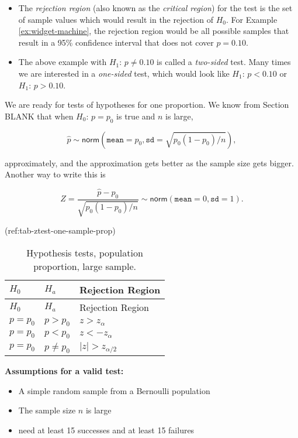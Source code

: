 \documentclass[]{book}
\providecommand{\tightlist}{%
  \setlength{\itemsep}{0pt}\setlength{\parskip}{0pt}}
\numberwithin{equation}{chapter}
\numberwithin{figure}{chapter}
\theoremstyle{plain}
\theoremstyle{definition}
\theoremstyle{remark}
\theoremstyle{definition}
\theoremstyle{definition}
\theoremstyle{remark}
\begin{document}
\begin{itemize}
\tightlist
\item
  The \emph{rejection region} (also known as the \emph{critical region})
  for the test is the set of sample values which would result in the
  rejection of \(H_{0}\). For Example \ref{ex:widget-machine}, the
  rejection region would be all possible samples that result in a 95\%
  confidence interval that does not cover \(p = 0.10\).
\item
  The above example with \(H_{1}:\,p \neq 0.10\) is called a
  \emph{two-sided} test. Many times we are interested in a
  \emph{one-sided} test, which would look like \(H_{1}:\,p < 0.10\) or
  \(H_{1}:\,p >  0.10\).
\end{itemize}

We are ready for tests of hypotheses for one proportion. We know from
Section BLANK that when \(H_{0}:\,p = p_{0}\) is true and \(n\) is
large,

\begin{equation}
\hat{p} \sim \mathsf{norm}(\mathtt{mean} = p_{0}, \mathtt{sd} = \sqrt{p_{0}(1 - p_{0})/n}),
\end{equation}

approximately, and the approximation gets better as the sample size gets
bigger. Another way to write this is

\begin{equation}
Z = \frac{\hat{p} - p_{0}}{\sqrt{p_{0}(1 - p_{0})/n}}  \sim \mathsf{norm}(\mathtt{mean} = 0, \mathtt{sd} = 1).
\end{equation}

(ref:tab-ztest-one-sample-prop)

\begin{longtable}[]{@{}lll@{}}
\caption{Hypothesis tests, population proportion, large
sample.}\tabularnewline
\toprule
\(H_{0}\) & \(H_{a}\) & Rejection Region\tabularnewline
\midrule
\endfirsthead
\toprule
\(H_{0}\) & \(H_{a}\) & Rejection Region\tabularnewline
\midrule
\endhead
\(p = p_{0}\) & \(p > p_{0}\) & \(z > z_{\alpha}\)\tabularnewline
\(p = p_{0}\) & \(p < p_{0}\) & \(z < -z_{\alpha}\)\tabularnewline
\(p = p_{0}\) & \(p \neq p_{0}\) &
\(\vert z \vert > z_{\alpha/2}\)\tabularnewline
\bottomrule
\end{longtable}

\textbf{Assumptions for a valid test:}

\begin{itemize}
\tightlist
\item
  A simple random sample from a Bernoulli population
\item
  The sample size \(n\) is large
\item
  need at least 15 successes and at least 15 failures
\end{itemize}
\end{document}

